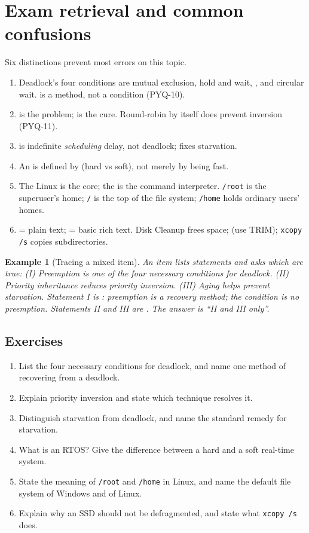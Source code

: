 \documentclass[11pt]{article}
\newtheorem{example}{Example}[section]
\begin{document}
\section{Exam retrieval and common confusions}
Six distinctions prevent most errors on this topic.
\begin{enumerate}
  \item Deadlock's four conditions are mutual exclusion, hold and wait,
    , and circular wait.  is a
     method, not a condition (PYQ-10).
  \item {} is the problem;  is
    the cure. Round-robin by itself does  prevent inversion (PYQ-11).
  \item {} is indefinite \emph{scheduling} delay, not deadlock;
     fixes starvation.
  \item An  is defined by  (hard vs soft), not
    merely by being fast.
  \item The Linux  is the core; the  is the command
    interpreter. \texttt{/root} is the superuser's home; \texttt{/} is the top
    of the file system; \texttt{/home} holds ordinary users' homes.
  \item {} = plain text;  = basic rich text. Disk
    Cleanup frees space;  (use TRIM);
    \texttt{xcopy /s} copies subdirectories.
\end{enumerate}

\begin{example}[Tracing a mixed item]
An item lists statements and asks which are true:
(I) Preemption is one of the four necessary conditions for deadlock.
(II) Priority inheritance reduces priority inversion.
(III) Aging helps prevent starvation.
Statement I is : preemption is a recovery method; the condition is
\emph{no} preemption. Statements II and III are . The answer is
``II and III only''.
\end{example}

\subsection*{Exercises}
\begin{enumerate}[label=\arabic*.]
  \item List the four necessary conditions for deadlock, and name one method
    of recovering from a deadlock.
  \item Explain priority inversion and state which technique resolves it.
  \item Distinguish starvation from deadlock, and name the standard remedy for
    starvation.
  \item What is an RTOS? Give the difference between a hard and a soft
    real-time system.
  \item State the meaning of \texttt{/root} and \texttt{/home} in Linux, and
    name the default file system of Windows and of Linux.
  \item Explain why an SSD should not be defragmented, and state what
    \texttt{xcopy /s} does.
\end{enumerate}
\end{document}
